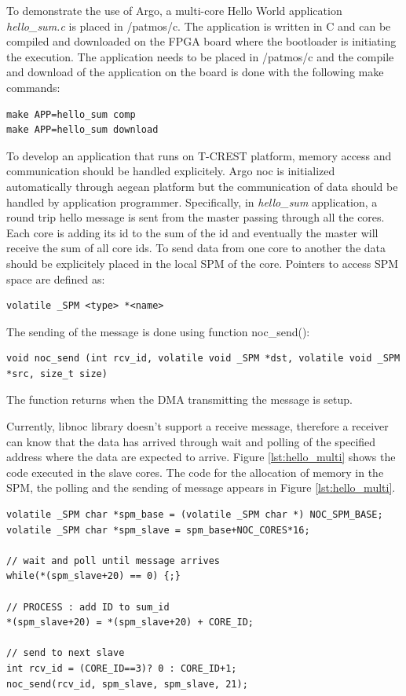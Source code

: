 \documentclass[a4paper,fontsize=10pt,twoside,DIV15,BCOR12mm,headinclude=true,footinclude=false,pagesize,bibtotoc]{scrbook}
\begin{document}
To demonstrate the use of Argo, a multi-core Hello World application \textit{hello\_sum.c} is placed in /patmos/c.
The application is written in C and can be compiled and downloaded on the FPGA board where the bootloader is initiating the execution.
The application needs to be placed in /patmos/c and the compile and download of the application on the board is done with the following make commands:

\begin{verbatim}
make APP=hello_sum comp
make APP=hello_sum download
\end{verbatim}

To develop an application that runs on T-CREST platform, memory access and communication should be handled explicitely.
Argo noc is initialized automatically through aegean platform but the communication of data should be handled by application programmer.
Specifically, in \textit{hello\_sum} application, a round trip hello message is sent from the master passing through all the cores.
Each core is adding its id to the sum of the id and eventually the master will receive the sum of all core ids.
To send data from one core to another the data should be explicitely placed in the local SPM of the core. Pointers to access SPM space are defined as:

\begin{lstlisting}
volatile _SPM <type> *<name>
\end{lstlisting}

The sending of the message is done using function noc\_send():

\begin{lstlisting}
void noc_send (int rcv_id, volatile void _SPM *dst, volatile void _SPM *src, size_t size)
\end{lstlisting}

The function returns when the DMA transmitting the message is setup.

Currently, libnoc library doesn't support a receive message,
therefore a receiver can know that the data has arrived through wait
and polling of the specified address where the data are expected to arrive.
Figure \ref{lst:hello_multi} shows the code executed in the slave cores.
The code for the allocation of memory in the SPM, the polling and the sending of message appears in Figure \ref{lst:hello_multi}.

\begin{lstlisting}[float,caption={A 2x2 Hello World application: Slave.\label{lst:hello_multi}}]
volatile _SPM char *spm_base = (volatile _SPM char *) NOC_SPM_BASE;
volatile _SPM char *spm_slave = spm_base+NOC_CORES*16;

// wait and poll until message arrives
while(*(spm_slave+20) == 0) {;}

// PROCESS : add ID to sum_id
*(spm_slave+20) = *(spm_slave+20) + CORE_ID;

// send to next slave
int rcv_id = (CORE_ID==3)? 0 : CORE_ID+1;
noc_send(rcv_id, spm_slave, spm_slave, 21);
\end{lstlisting}
\end{document}
